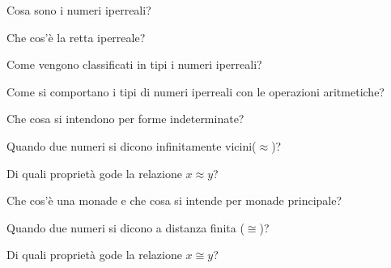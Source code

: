 \begin{multicols}{2}
\begin{esercizio}\label{ese:iper_013}
Cosa sono i numeri iperreali?
\end{esercizio}

\begin{esercizio}\label{ese:iper_014}
Che cos'è la retta iperreale?
\end{esercizio}

\begin{esercizio}\label{ese:iper_015}
Come vengono classificati in tipi i numeri iperreali?
\end{esercizio}

\begin{esercizio}\label{ese:iper_016}
Come si comportano i tipi di numeri iperreali con le operazioni aritmetiche?
\begin{description} [nosep]
 \item [Addizione/sottrazione:]
 \item [Moltiplicazione:]
 \item [Reciproco:]
 \item [Divisione:]
\end{description}
\end{esercizio}

\begin{esercizio}\label{ese:iper_017}
Che cosa si intendono per forme indeterminate?
\end{esercizio}

\begin{esercizio}\label{ese:iper_018}
Quando due numeri si dicono infinitamente vicini(\(\approx\))?
\end{esercizio}

\begin{esercizio}\label{ese:iper_019}
Di quali proprietà gode la relazione \(x \approx y\)?
\end{esercizio}

\begin{esercizio}\label{ese:iper_020}
Che cos'è una monade e che cosa si intende per monade principale?
\end{esercizio}

\begin{esercizio}\label{ese:iper_021}
Quando due numeri si dicono a distanza finita (\(\cong\))?
\end{esercizio}

\begin{esercizio}\label{ese:iper_022}
Di quali proprietà gode la relazione \(x \cong y\)?
\end{esercizio}


\end{multicols}

